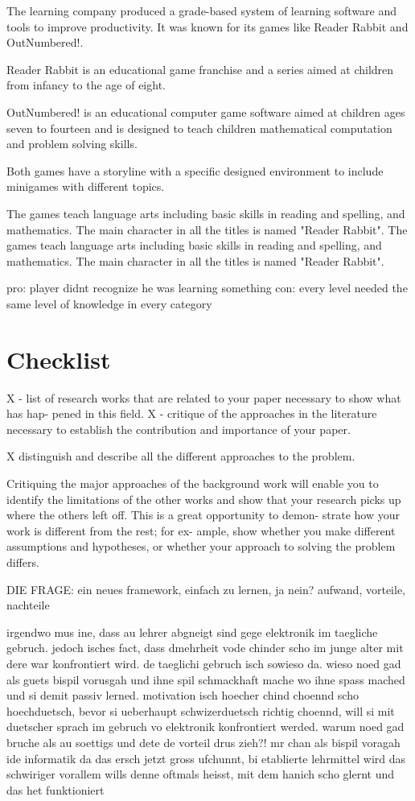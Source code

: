 The learning company produced a grade-based system of learning software and tools to improve productivity.
It was known for its games like Reader Rabbit\cite{readerrabbit} and OutNumbered!\cite{outnumbered}.

Reader Rabbit is an educational game franchise and a series aimed at children from infancy to the age of eight.

OutNumbered! is an educational computer game software aimed at children ages seven to fourteen and
is designed to teach children mathematical computation and problem solving skills.

Both games have a storyline with a specific designed environment to include minigames with different topics.

The games teach language arts including basic skills in reading and spelling, and mathematics. The main character in all the titles is named "Reader Rabbit".
The games teach language arts including basic skills in reading and spelling, and mathematics. The main character in all the titles is named "Reader Rabbit".

pro: player didnt recognize he was learning something
con: every level needed the same level of knowledge in every category


\section{Checklist}
X - list of research works that are related to your paper necessary to show what has hap-
pened in this field.
X - critique of the approaches in the literature necessary to establish the
contribution and importance of your paper.

X distinguish and describe all the different approaches to the problem.

Critiquing the major approaches of the background
work will enable you to identify the limitations of the
other works and show that your research picks up where
the others left off. This is a great opportunity to demon-
strate how your work is different from the rest; for ex-
ample, show whether you make different assumptions
and hypotheses, or whether your approach to solving the
problem differs.

DIE FRAGE: ein neues framework, einfach zu lernen, ja nein? aufwand, vorteile, nachteile

irgendwo mus ine, dass au lehrer abgneigt sind gege elektronik im taegliche gebruch. jedoch isches fact, 
dass dmehrheit vode chinder scho im junge alter mit dere war konfrontiert wird. de taeglichi gebruch isch sowieso da. 
wieso noed gad als guets bispil vorusgah und ihne spil schmackhaft mache wo ihne spass mached und si demit passiv lerned. 
motivation isch hoecher
chind choennd scho hoechduetsch, bevor si ueberhaupt schwizerduetsch richtig choennd, will si mit duetscher sprach im gebruch vo elektronik
konfrontiert werded. warum noed gad bruche als au soettigs und dete de vorteil drus zieh?! mr chan als bispil voragah ide informatik
da das ersch jetzt gross ufchunnt, bi etablierte lehrmittel wird das schwiriger vorallem wills denne oftmals heisst, 
mit dem hanich scho glernt und das het funktioniert
